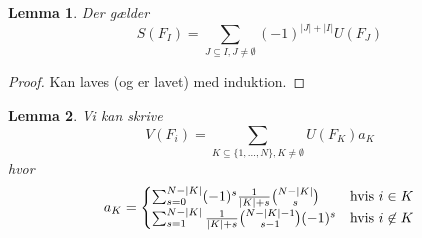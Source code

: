 \documentclass[a4paper, 12pt]{article}
\newtheorem{lemma}{Lemma}
\begin{document}
\begin{lemma}\label{alternating}
Der gælder
\begin{equation}
S(F_I)=\sum_{J\subseteq I, J\neq \emptyset} (-1)^{|J|+|I|} U(F_J)
\end{equation}
\end{lemma}
\begin{proof}
Kan laves (og er lavet) med induktion. 
\end{proof}
\begin{lemma}\label{coefficient}
Vi kan skrive
\begin{equation}
V(F_i)=\sum_{K\subseteq \{1, \dots, N\}, K\neq \emptyset} U(F_K)a_K
\end{equation}
hvor 
\begin{equation}
a_K=\begin{cases} \sum_{s=0}^{N-|K|} (-1)^s \frac{1}{|K|+s}{N-|K|\choose s} \quad &\textup{hvis } i\in K\\
\sum_{s=1}^{N-|K|}\frac{1}{|K|+s}{N-|K|-1 \choose s-1} (-1)^s &\textup{hvis } i\not\in K
\end{cases}
\end{equation}
\end{lemma}
\end{document}
